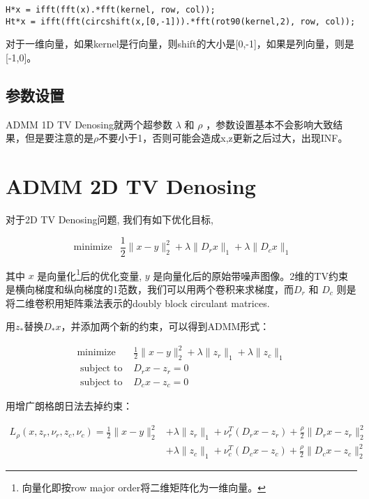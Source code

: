 \documentclass[10pt]{report}
\begin{document}
\begin{verbatim}
H*x = ifft(fft(x).*fft(kernel, row, col));
Ht*x = ifft(fft(circshift(x,[0,-1])).*fft(rot90(kernel,2), row, col));
\end{verbatim}

对于一维向量，如果kernel是行向量，则shift的大小是[0,-1]，如果是列向量，则是[-1,0]。

\subsection{参数设置}

ADMM 1D TV Denosing就两个超参数 $\lambda$ 和 $\rho$ ，参数设置基本不会影响大致结果，但是要注意的是$\rho$不要小于1，否则可能会造成x,z更新之后过大，出现INF。

\section{ADMM 2D TV Denosing}

对于2D TV Denosing问题, 我们有如下优化目标, 

\begin{equation}
	\operatorname{minimize} \enspace \frac{1}{2} \|x-y\|_{2}^{2} + \lambda\|D_r x\|_{1} + \lambda\|D_c x\|_{1}
\end{equation}

其中 $x$ 是向量化\footnote{向量化即按row major order将二维矩阵化为一维向量。}后的优化变量, $y$ 是向量化后的原始带噪声图像。2维的TV约束是横向梯度和纵向梯度的1范数，我们可以用两个卷积来求梯度，而$D_r$ 和 $D_c$ 则是将二维卷积用矩阵乘法表示的doubly block circulant matrices.

用$ z_*$替换$D_* x$，并添加两个新的约束，可以得到ADMM形式：

\begin{equation}
\begin{array}{ll}
\operatorname{minimize} & \frac{1}{2} \|x-y\|_{2}^{2} + \lambda\|z_r\|_{1} + \lambda\|z_c\|_{1} \\
\text { subject to } & D_r x-z_r=0 \\
\text { subject to } & D_c x-z_c=0
\end{array}
\end{equation}

用增广朗格朗日法去掉约束：

\begin{equation}
\begin{aligned}
L_{\rho}( x , z_r , \nu_r, z_c, \nu_c ) = \frac{1}{2}\|x-y\|_{2}^{2} &  + \lambda\|z_r\|_{1}+ \nu_r ^{ T }(D_r x-z_r)+\frac{\rho}{2}\|D_r x -z_r\|_{2}^{2} \\
& + \lambda\|z_c\|_{1}+ \nu_c ^{ T }(D_c x-z_c)+\frac{\rho}{2}\|D_c x -z_c\|_{2}^{2}
\end{aligned}
\label{eq-2d-aug} 
\end{equation}
\end{document}
